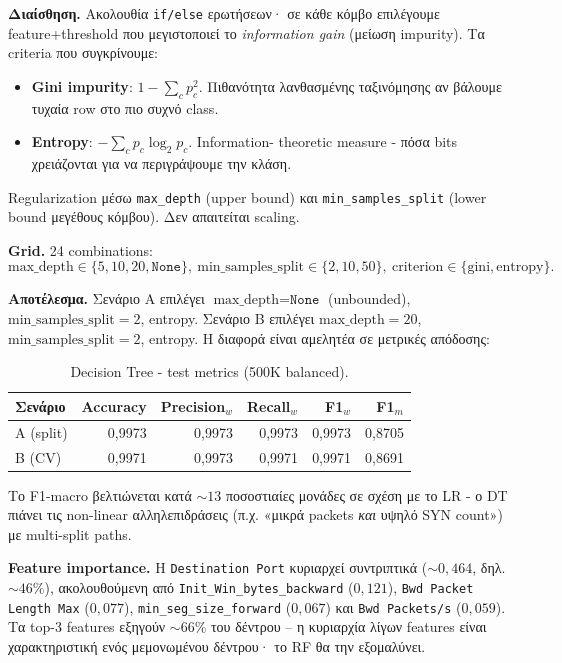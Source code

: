 \documentclass[12pt,a4paper,twoside]{book}
\begin{document}
\textbf{Διαίσθηση.} Ακολουθία \texttt{if/else} ερωτήσεων· σε κάθε
κόμβο επιλέγουμε feature+threshold που μεγιστοποιεί το
\emph{information gain} (μείωση impurity). Τα criteria που
συγκρίνουμε:
\begin{itemize}
    \item \textbf{Gini impurity}: \(1 - \sum_c p_c^2\). Πιθανότητα
    λανθασμένης ταξινόμησης αν βάλουμε τυχαία row στο πιο συχνό class.
    \item \textbf{Entropy}: \(-\sum_c p_c \log_2 p_c\). Information-
    theoretic measure - πόσα bits χρειάζονται για να περιγράψουμε την
    κλάση.
\end{itemize}
Regularization μέσω \texttt{max\_depth} (upper bound) και
\texttt{min\_samples\_split} (lower bound μεγέθους κόμβου). Δεν
απαιτείται scaling.

\textbf{Grid.} 24 combinations:
\[
\text{max\_depth}\in\{5,10,20,\texttt{None}\},\
\text{min\_samples\_split}\in\{2,10,50\},\
\text{criterion}\in\{\text{gini},\text{entropy}\}.
\]

\textbf{Αποτέλεσμα.} Σενάριο A επιλέγει
\(\text{max\_depth}=\texttt{None}\) (unbounded),
\(\text{min\_samples\_split}=2\), entropy.
Σενάριο B επιλέγει \(\text{max\_depth}=20\),
\(\text{min\_samples\_split}=2\), entropy. Η διαφορά είναι αμελητέα
σε μετρικές απόδοσης:

\begin{table}[H]
    \centering
    \begin{tabular}{lrrrrr}
        \toprule
        \textbf{Σενάριο} & \textbf{Accuracy} & \textbf{Precision\(_w\)}
        & \textbf{Recall\(_w\)} & \textbf{F1\(_w\)} & \textbf{F1\(_m\)} \\
        \midrule
        A (split) & 0,9973 & 0,9973 & 0,9973 & 0,9973 & 0,8705 \\
        B (CV)    & 0,9971 & 0,9973 & 0,9971 & 0,9971 & 0,8691 \\
        \bottomrule
    \end{tabular}
    \caption{Decision Tree - test metrics (500K balanced).}\label{tab:q2_dt}
\end{table}

Το F1-macro βελτιώνεται κατά \(\sim 13\) ποσοστιαίες μονάδες σε σχέση
με το LR - ο DT πιάνει τις non-linear αλληλεπιδράσεις (π.χ. «μικρά
packets \emph{και} υψηλό SYN count») με multi-split paths.

\textbf{Feature importance.} Η \texttt{Destination Port} κυριαρχεί
συντριπτικά (\(\sim 0{,}464\), δηλ. \(\sim 46\%\)), ακολουθούμενη από
\texttt{Init\_Win\_bytes\_backward} (\(0{,}121\)),
\texttt{Bwd Packet Length Max} (\(0{,}077\)),
\texttt{min\_seg\_size\_forward} (\(0{,}067\)) και
\texttt{Bwd Packets/s} (\(0{,}059\)). Τα top-3 features εξηγούν
\(\sim 66\%\) του δέντρου -- η κυριαρχία λίγων features είναι
χαρακτηριστική ενός μεμονωμένου δέντρου· το RF θα την εξομαλύνει.
\end{document}
